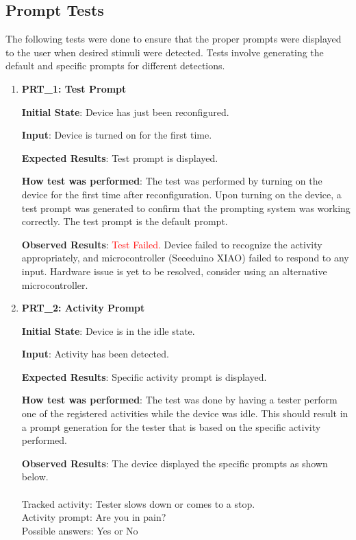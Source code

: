\documentclass[12pt, titlepage]{article}
\begin{document}
\subsection{Prompt Tests}

The following tests were done to ensure that the proper prompts were displayed to the user when desired stimuli were detected. Tests involve generating the default and specific prompts for different detections.

\begin{enumerate}
  \item{\textbf{PRT\_1: Test Prompt} \\}\label{PRT1}

  \textbf{Initial State}: Device has just been reconfigured.

  \textbf{Input}: Device is turned on for the first time.

  \textbf{Expected Results}: Test prompt is displayed.

  \textbf{How test was performed}: The test was performed by turning on the device for the first time after reconfiguration. Upon turning on the device, a test prompt was generated to confirm that the prompting system was working correctly. The test prompt is the default prompt.

  \textbf{Observed Results}: \textcolor{red}{Test Failed.} Device failed to recognize the activity appropriately, and microcontroller (Seeeduino XIAO) failed to respond to any input. Hardware issue is yet to be resolved, consider using an alternative microcontroller.

  \item{\textbf{PRT\_2: Activity Prompt} \\}\label{PRT2}

  \textbf{Initial State}: Device is in the idle state.

  \textbf{Input}: Activity has been detected.

  \textbf{Expected Results}: Specific activity prompt is displayed.

  \textbf{How test was performed}: The test was done by having a tester perform one of the registered activities while the device was idle. This should result in a prompt generation for the tester that is based on the specific activity performed.

  \textbf{Observed Results}: The device displayed the specific prompts as shown below.\\\\
  Tracked activity: Tester slows down or comes to a stop.\\
  Activity prompt: Are you in pain?\\
  Possible answers: Yes or No

\end{enumerate}
\end{document}
